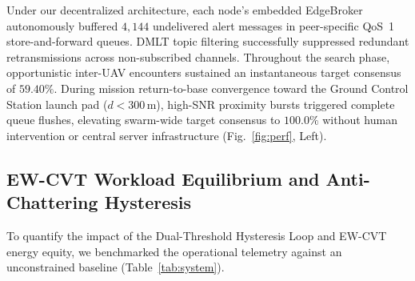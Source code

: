 \documentclass[conference]{IEEEtran}
\begin{document}
Under our decentralized architecture, each node's embedded EdgeBroker autonomously buffered $4,144$ undelivered alert messages in peer-specific QoS~1 store-and-forward queues. DMLT topic filtering successfully suppressed redundant retransmissions across non-subscribed channels. Throughout the search phase, opportunistic inter-UAV encounters sustained an instantaneous target consensus of $59.40\%$. During mission return-to-base convergence toward the Ground Control Station launch pad ($d < 300\,\text{m}$), high-SNR proximity bursts triggered complete queue flushes, elevating swarm-wide target consensus to $100.0\%$ without human intervention or central server infrastructure (Fig.~\ref{fig:perf}, Left).

\subsection{EW-CVT Workload Equilibrium and Anti-Chattering Hysteresis}
To quantify the impact of the Dual-Threshold Hysteresis Loop and EW-CVT energy equity, we benchmarked the operational telemetry against an unconstrained baseline (Table~\ref{tab:system}).
\end{document}
